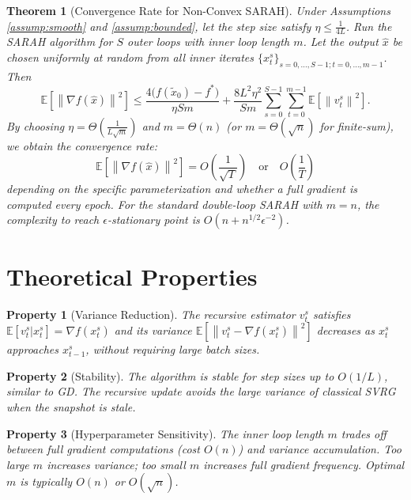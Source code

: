 \documentclass{article}
\newtheorem{theorem}{Theorem}
\newtheorem{property}{Property}
\newcommand{\E}{\mathbb{E}}
\newcommand{\norm}[1]{\left\| #1 \right\|}
\newcommand{\grad}{\nabla}
\begin{document}
\begin{theorem}[Convergence Rate for Non-Convex SARAH]
\label{thm:main}
Under Assumptions \ref{assump:smooth} and \ref{assump:bounded}, let the step size satisfy $\eta \le \frac{1}{4L}$. Run the SARAH algorithm for $S$ outer loops with inner loop length $m$. Let the output $\hat{x}$ be chosen uniformly at random from all inner iterates $\{x_t^s\}_{s=0,\dots,S-1; t=0,\dots,m-1}$. Then
\begin{equation}
    \E\left[ \norm{\grad f(\hat{x})}^2 \right] \le \frac{4 \big( f(\tilde{x}_0) - f^* \big)}{\eta S m} + \frac{8 L^2 \eta^2}{S m} \sum_{s=0}^{S-1} \sum_{t=0}^{m-1} \E\left[ \norm{v_t^s}^2 \right].
\end{equation}
By choosing $\eta = \Theta\left( \frac{1}{L \sqrt{m}} \right)$ and $m = \Theta(n)$ (or $m = \Theta(\sqrt{n})$ for finite-sum), we obtain the convergence rate:
\begin{equation}
    \E\left[ \norm{\grad f(\hat{x})}^2 \right] = O\left( \frac{1}{\sqrt{T}} \right) \quad \text{or} \quad O\left( \frac{1}{T} \right)
\end{equation}
depending on the specific parameterization and whether a full gradient is computed every epoch. For the standard double-loop SARAH with $m = n$, the complexity to reach $\epsilon$-stationary point is $O(n + n^{1/2} \epsilon^{-2})$.
\end{theorem}

\section*{Theoretical Properties}

\begin{property}[Variance Reduction]
The recursive estimator $v_t^s$ satisfies $\E[v_t^s | x_t^s] = \grad f(x_t^s)$ and its variance $\E[\norm{v_t^s - \grad f(x_t^s)}^2]$ decreases as $x_t^s$ approaches $x_{t-1}^s$, without requiring large batch sizes.
\end{property}

\begin{property}[Stability]
The algorithm is stable for step sizes up to $O(1/L)$, similar to GD. The recursive update avoids the large variance of classical SVRG when the snapshot is stale.
\end{property}

\begin{property}[Hyperparameter Sensitivity]
The inner loop length $m$ trades off between full gradient computations (cost $O(n)$) and variance accumulation. Too large $m$ increases variance; too small $m$ increases full gradient frequency. Optimal $m$ is typically $O(n)$ or $O(\sqrt{n})$.
\end{property}
\end{document}

